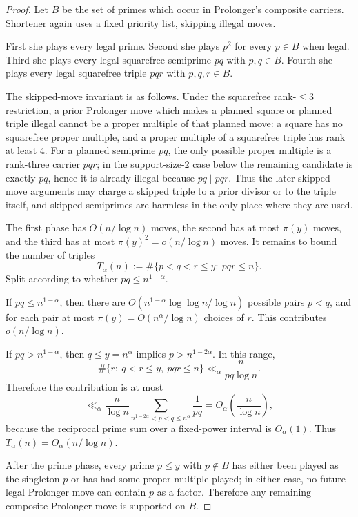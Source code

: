 \begin{proof}
Let $B$ be the set of primes which occur in Prolonger's composite carriers.
Shortener again uses a fixed priority list, skipping illegal moves.

First she plays every legal prime.  Second she plays $p^2$ for every
$p\in B$ when legal.  Third she plays every legal squarefree semiprime $pq$
with $p,q\in B$.  Fourth she plays every legal squarefree triple $pqr$ with
$p,q,r\in B$.

The skipped-move invariant is as follows.  Under the squarefree rank-$\le3$
restriction, a prior Prolonger move which makes a planned square or planned
triple illegal cannot be a proper multiple of that planned move: a square has no
squarefree proper multiple, and a proper multiple of a squarefree triple has
rank at least $4$.  For a planned semiprime $pq$, the only possible proper
multiple is a rank-three carrier $pqr$; in the support-size-$2$ case below the
remaining candidate is exactly $pq$, hence it is already illegal because
$pq\mid pqr$.  Thus the later skipped-move arguments may charge a skipped
triple to a prior divisor or to the triple itself, and skipped semiprimes are
harmless in the only place where they are used.

The first phase has $O(n/\log n)$ moves, the second has at most $\pi(y)$ moves,
and the third has at most $\pi(y)^2=o(n/\log n)$ moves.  It remains to bound
the number of triples
\[
  T_\alpha(n):=\#\{p<q<r\le y:\ pqr\le n\}.
\]
Split according to whether $pq\le n^{1-\alpha}$.

If $pq\le n^{1-\alpha}$, then there are
$O(n^{1-\alpha}\log\log n/\log n)$ possible pairs $p<q$, and for each pair at
most $\pi(y)=O(n^\alpha/\log n)$ choices of $r$.  This contributes
$o(n/\log n)$.

If $pq>n^{1-\alpha}$, then $q\le y=n^\alpha$ implies
$p>n^{1-2\alpha}$.  In this range,
\[
  \#\{r:\ q<r\le y,\ pqr\le n\}
  \ll_\alpha \frac{n}{pq\log n}.
\]
Therefore the contribution is at most
\[
  \ll_\alpha
  \frac n{\log n}
  \sum_{n^{1-2\alpha}<p<q\le n^\alpha}\frac1{pq}
  =
  O_\alpha\!\left(\frac n{\log n}\right),
\]
because the reciprocal prime sum over a fixed-power interval is $O_\alpha(1)$.
Thus $T_\alpha(n)=O_\alpha(n/\log n)$.

After the prime phase, every prime $p\le y$ with $p\notin B$ has either been
played as the singleton $p$ or has had some proper multiple played; in either
case, no future legal Prolonger move can contain $p$ as a factor.  Therefore
any remaining composite Prolonger move is supported on $B$.


\end{proof}
